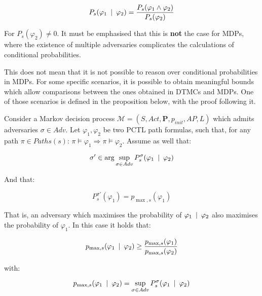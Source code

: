 \begin{equation}
	P_s (\varphi_1 \:\mid\: \varphi_2) = \frac{P_s (\varphi_1 \wedge \varphi_2)}{P_s (\varphi_2)}
\end{equation}

For $P_s (\varphi_2) \neq 0$. It must be emphasised that this is \textbf{not} the case for MDPs, where the existence of multiple adversaries complicates the calculations of conditional probabilities.

This does not mean that it is not possible to reason over conditional probabilities in MDPs. For some specific scenarios, it is possible to obtain meaningful bounds which allow comparisons between the ones obtained in DTMCs and MDPs. One of those scenarios is defined in the proposition below, with the proof following it.

\begin{proposition}
\label{pro:cond_props}
Consider a Markov decision process $\mathcal{M} = (S, Act, \mathbf{P}, p_{init}, AP, L)$ which admits adversaries $\sigma \in Adv$. Let $\varphi_1, \varphi_2$ be two PCTL path formulas, such that, for any path $\pi \in Paths(s)$: $\pi \models \varphi_1 \Rightarrow \pi \models \varphi_2$. Assume as well that:

\begin{equation}
	\sigma' \in \arg\sup_{\sigma \in Adv} P^{\sigma}_s (\varphi_1 \:\mid\: \varphi_2)
\end{equation}

And that:

\begin{equation}
	P^{\sigma'}_s (\varphi_1) = p_{\max, s} (\varphi_1)
\end{equation}

That is, an adversary which maximises the probability of $\varphi_1 \:\mid\: \varphi_2$ also maximises the probability of $\varphi_1$. In this case it holds that:

\begin{equation}
	p_{\max, s} (\varphi_1 \:\mid\: \varphi_2) \geq \frac{p_{\max, s} (\varphi_1)}{p_{\max, s} (\varphi_2)}
\end{equation}

with:

\begin{equation}
	p_{\max, s} (\varphi_1 \:\mid\: \varphi_2) = \sup_{\sigma \in Adv} P^{\sigma}_s (\varphi_1 \:\mid\: \varphi_2)
\end{equation}

\end{proposition}
 
